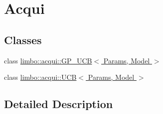 \hypertarget{group__acqui}{}\section{Acqui}
\label{group__acqui}
\subsection*{Classes}
\begin{DoxyCompactItemize}
\item 
class \hyperlink{classlimbo_1_1acqui_1_1_g_p___u_c_b}{limbo\+::acqui\+::\+G\+P\+\_\+\+U\+C\+B$<$ Params, Model $>$}
\item 
class \hyperlink{classlimbo_1_1acqui_1_1_u_c_b}{limbo\+::acqui\+::\+U\+C\+B$<$ Params, Model $>$}
\end{DoxyCompactItemize}


\subsection{Detailed Description}
